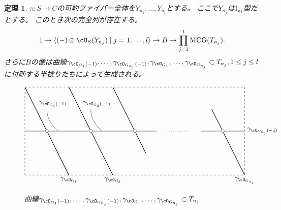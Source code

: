\documentclass[uplatex,a4paper,dvipdfmx]{jsarticle}
\theoremstyle{plain}
\newtheorem{theorem}{定理}[section]
\theoremstyle{definition}
\DeclareMathOperator{\MCG}{\mathrm{MCG}}
\begin{document}
\begin{theorem}
	$\pi \colon S \to C$の可約ファイバー全体を$Y_{n_1}, \dots, Y_{n_l}$とする。
	ここで$Y_{n_j}$は$\rm{I}_{n_j}$型だとする。
	このとき次の完全列が存在する。
	\begin{equation}
		1 \to \langle (-)\otimes \cO_S(Y_{n_j}) \mid j = 1, \dots, l\rangle \to B \to \prod_{j=1}^l \MCG(T_{n_j}).
	\end{equation}
	さらに$B$の像は曲線$\gamma_{\cO_{G_1}(-1)}, \dots, \gamma_{\cO_{G_{n_j}}(-1)}, \gamma_{\cO_{G_1}}, \dots, \gamma_{\cO_{G_{n_j}}} \subset T_{n_j}, 1\leq j \leq l$に付随する半捻りたちによって生成される。
	\begin{figure}[h]
		\centering
		\begin{displaymath}
			\begin{tikzpicture}[scale=1.2]
				\draw[dashed] (0,0)--(10,0);
				\draw[dashed] (0,0)--(0,4);
				\draw[dashed] (0,4)--(10,4);
				\draw[dashed] (10,4)--(10,0);

				\draw[thick] (0, 2)--(1, 2);
				\draw[thick] (1, 2)--(3, 2);
				\draw[thick] (3, 2)--(5, 2);
				\draw[thick] (5, 2)--(6, 2);
				\draw[thick] (8, 2)--(9, 2);
				\draw[thick] (9, 2)--(10, 2);


				\draw[thick] (0, 4)--(1, 2);
				\draw[thick] (1, 2)--(2, 0);
				\draw[thick] (2, 4)--(4, 0);
				\draw[thick] (4, 4)--(5, 2);
				\draw[thick] (5, 2)--(5.5, 1);
				\draw[thick] (8.5, 3)--(9, 2);
				\draw[thick] (9, 2)--(10, 0);

				\draw[dotted, thick] (5+1.5, 2)--(9-1.5, 2);
				\foreach \u in {1, 3, 5, 9}
					{
						\filldraw[white] (\u, 2) circle (2pt);
						\draw[black] (\u, 2) circle (2pt);
					}

				\draw(2, 0) node[below]{$\gamma_{\cO_{G_1}}$};
				\draw(4, 0) node[below]{$\gamma_{\cO_{G_2}}$};
				\draw(10, 0) node[below]{$\gamma_{\cO_{G_{n_j}}}$};

				\draw(2, 3) node[above left]{$\gamma_{\cO_{G_1}(-1)}$};
				\draw(1, 3) to[out=-90,in=135](1.5, 2);
				\draw(4, 3) node[above left]{$\gamma_{\cO_{G_2}(-1)}$};
				\draw(3, 3) to[out=-90,in=135](3.5, 2);

				\draw(10, 2) node[right]{$\gamma_{\cO_{G_{n_j}}(-1)}$};

			\end{tikzpicture}
		\end{displaymath}
		\caption{曲線$\gamma_{\cO_{G_1}(-1)}, \dots, \gamma_{\cO_{G_{n_j}}(-1)}, \gamma_{\cO_{G_1}}, \dots, \gamma_{\cO_{G_{n_j}}} \subset T_{n_j}$}
	\end{figure}
\end{theorem}


\end{document}
